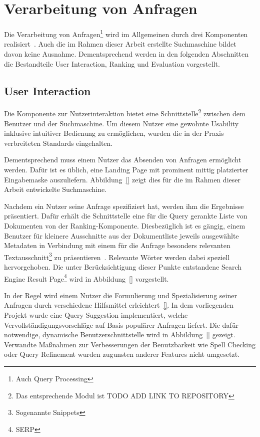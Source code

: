 \section{Verarbeitung von Anfragen}
\label{chap:query_processing}

Die Verarbeitung von Anfragen\footnote{Auch Query Processing} wird im Allgemeinen durch drei Komponenten realisiert~\cite{croft.chap2}.
Auch die im Rahmen dieser Arbeit erstellte Suchmaschine bildet davon keine Ausnahme.
Dementsprechend werden in den folgenden Abschnitten die Bestandteile User Interaction, Ranking und Evaluation vorgestellt.

\subsection{User Interaction~\cite{croft.chap2}}
\label{chap:query_processing}

Die Komponente zur Nutzerinteraktion bietet eine Schnittstelle\footnote{Das entsprechende Modul ist TODO ADD LINK TO REPOSITORY}
zwischen dem Benutzer und der Suchmaschine.
Um diesem Nutzer eine gewohnte Usability inklusive intuitiver Bedienung zu ermöglichen,
wurden die in der Praxis verbreiteten Standards eingehalten.

Dementsprechend muss einem Nutzer das Absenden von Anfragen ermöglicht werden.
Dafür ist es üblich, eine Landing Page mit prominent mittig platzierter Eingabemaske auszuliefern\cite{}.
Abbildung~\ref{} zeigt dies für die im Rahmen dieser Arbeit entwickelte Suchmaschine.

Nachdem ein Nutzer seine Anfrage spezifiziert hat, werden ihm die Ergebnisse präsentiert.
Dafür erhält die Schnittstelle eine für die Query gerankte Liste von Dokumenten von der Ranking-Komponente.
Diesbezüglich ist es gängig, einem Benutzer für kleinere Ausschnitte aus der Dokumentliste jeweils 
ausgewählte Metadaten in Verbindung mit einem 
für die Anfrage besonders relevanten Textausschnitt\footnote{Sogenannte Snippets} zu präsentieren~\cite{}.
Relevante Wörter werden dabei speziell hervorgehoben.
Die unter Berücksichtigung dieser Punkte entstandene Search Engine Result Page\footnote{SERP} wird in Abbildung~\ref{} vorgestellt.

In der Regel wird einem Nutzer die Formulierung und Spezialisierung seiner Anfragen durch verschiedene Hilfsmittel
erleichtert~\ref{}.
In dem vorliegenden Projekt wurde eine Query Suggestion implementiert,
welche Vervollständigungsvorschläge auf Basis populärer Anfragen liefert.
Die dafür notwendige, dynamische Benutzerschnittstelle wird in Abbildung~\ref{} gezeigt.
Verwandte Maßnahmen zur Verbesserungen der Benutzbarkeit wie Spell Checking oder Query Refinement 
wurden zugunsten anderer Features nicht umgesetzt.

